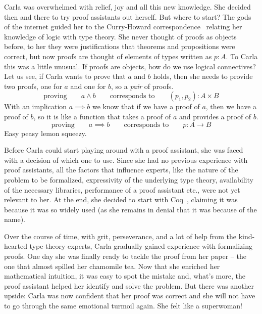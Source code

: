 Carla was overwhelmed with relief, joy and all this new knowledge. She decided then and there to try proof assistants out herself.
But where to start? The gods of the internet guided her to the Curry-Howard correspondence~ relating her knowledge of logic with type theory. She never thought of proofs as objects before, to her they were justifications that theorems and propositions were correct, but now proofs are thought of elements of types written as $p : A$. To Carla this was a little unusual. If proofs are objects, how do we use logical connectives? Let us see, if Carla wants to prove that $a$ and $b$ holds, then she needs to provide two proofs, one for $a$ and one for $b$, so a \emph{pair} of proofs.
%
\begin{equation*}
    \text{proving} \qquad a \wedge b \qquad \text{corresponds to} \qquad (p_1, p_2) : A \times B
\end{equation*}
%
With an implication $a \implies b$ we know that if we have a proof of $a$, then we have a proof of $b$, so it is like a function that takes a proof of $a$ and provides a proof of $b$.
%
\begin{equation*}
    \text{proving} \qquad a \implies b \qquad \text{corresponds to} \qquad p : A \to B
\end{equation*}
%
Easy peasy lemon squeezy.

Before Carla could start playing around with a proof assistant, she was faced with a decision of which one to use. Since she had no previous experience with proof assistants, all the factors that influence experts, like the nature of the problem to be formalized, expressivity of the underlying type theory, availability of the necessary libraries, performance of a proof assistant etc., were not yet relevant to her. At the end, she decided to start with Coq~, claiming it was because it was so widely used (as she remains in denial that it was because of the name).

Over the course of time, with grit, perseverance, and a lot of help from the kind-hearted type-theory experts, Carla gradually gained experience with formalizing proofs.
One day she was finally ready to tackle the proof from her paper -- the one that almost spilled her chamomile tea. Now that she enriched her mathematical intuition, it was easy to spot the mistake and, what's more, the proof assistant helped her identify and solve the problem. But there was another upside: Carla was now confident that her proof was correct and she will not have to go through the same emotional turmoil again. She felt like a superwoman!

